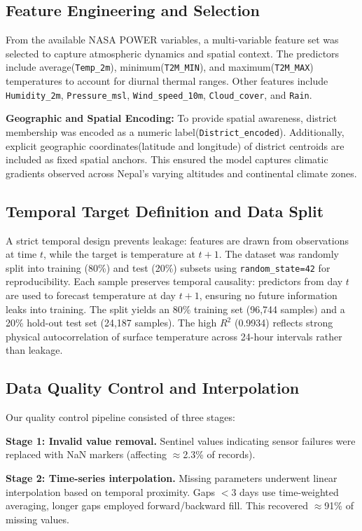 \documentclass[conference]{IEEEtran}
\begin{document}
\subsection{Feature Engineering and Selection}
From the available NASA POWER variables, a multi-variable feature set was selected to capture atmospheric dynamics and spatial context. The predictors include average(\texttt{Temp\_2m}), minimum(\texttt{T2M\_MIN}), and maximum(\texttt{T2M\_MAX}) temperatures to account for diurnal thermal ranges. Other features include \texttt{Humidity\_2m}, \texttt{Pressure\_msl}, \texttt{Wind\_speed\_10m}, \texttt{Cloud\_cover}, and \texttt{Rain}. 

\textbf{Geographic and Spatial Encoding:} To provide spatial awareness, district membership was encoded as a numeric label(\texttt{District\_encoded}). Additionally, explicit geographic coordinates(latitude and longitude) of district centroids are included as fixed spatial anchors. This ensured the model captures climatic gradients observed across Nepal's varying altitudes and continental climate zones.

\subsection{Temporal Target Definition and Data Split}
A strict temporal design prevents leakage: features are drawn from observations at time $t$, while the target is temperature at $t+1$. The dataset was randomly split into training (80\%) and test (20\%) subsets using \texttt{random\_state=42} for reproducibility. Each sample preserves temporal causality: predictors from day $t$ are used to forecast temperature at day $t+1$, ensuring no future information leaks into training. The split yields an 80\% training set (96,744 samples) and a 20\% hold-out test set (24,187 samples). The high $R^2$ (0.9934) reflects strong physical autocorrelation of surface temperature across 24-hour intervals rather than leakage.

\subsection{Data Quality Control and Interpolation}
Our quality control pipeline consisted of three stages:

\textbf{Stage 1: Invalid value removal.} Sentinel values indicating sensor failures were replaced with NaN markers (affecting $\approx$2.3\% of records).

\textbf{Stage 2: Time-series interpolation.} Missing parameters underwent linear interpolation based on temporal proximity. Gaps $<$3 days use time-weighted averaging, longer gaps employed forward/backward fill. This recovered $\approx$91\% of missing values.
\end{document}
